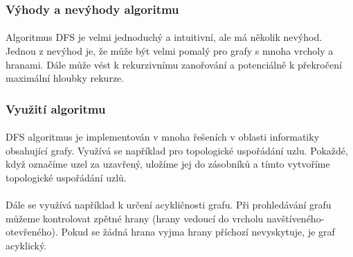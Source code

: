 \documentclass[12pt, titlepage, a4paper]{article}
\begin{document}
\subsubsection{Výhody a nevýhody algoritmu}
\paragraph{}
Algoritmus DFS je velmi jednoduchý a intuitivní, ale má několik nevýhod. Jednou z
nevýhod je, že může být velmi pomalý pro grafy s mnoha vrcholy a hranami. Dále může
vést k rekurzivnímu zanořování a potenciálně k překročení maximální hloubky rekurze.

\subsubsection{Využití algoritmu}
\paragraph{}
DFS algoritmus je implementován v mnoha řešeních v oblasti informatiky obsahující grafy.
Využívá se například pro topologické uspořádání uzlu. Pokaždé, když označíme uzel za uzavřený,
uložíme jej do zásobníků a tímto vytvoříme topologické uspořádání uzlů.
\paragraph{}
Dále se využívá například k určení acykličnosti grafu. Při prohledávání grafu můžeme kontrolovat zpětné hrany (hrany
vedoucí do vrcholu navštíveného-otevřeného). Pokud se žádná hrana vyjma hrany příchozí
nevyskytuje, je graf acyklický.

\newpage
\end{document}
